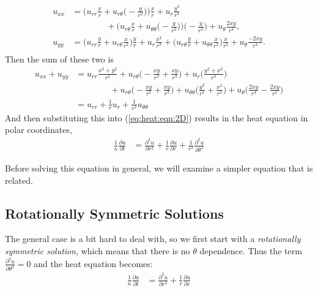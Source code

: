 %
\begin{align*}
u_{xx} & = \biggl(u_{rr} \frac{x}{r} + u_{r\theta} \biggl(-\frac{y}{r^2} \biggr) \biggr)\frac{x}{r} + u_r \frac{y^2}{r^3} \\
& \qquad \qquad + \biggl(u_{r\theta}\frac{x}{r} + u_{\theta\theta}\biggl(-\frac{y}{r^2} \biggr) \biggr)\biggl(-\frac{y}{r^2} \biggr) + u_{\theta}\frac{2xy}{r^4},   \\
u_{yy} & = \biggl(u_{rr} \frac{y}{r} + u_{r\theta} \frac{x}{r^2} \biggr)\frac{y}{r} + u_r \frac{x^2}{r^3} + \biggl(u_{r \theta}\frac{y}{r} + u_{\theta\theta} \frac{x}{r^2} \biggr) \frac{x}{r^2} + u_{\theta}\frac{-2xy}{r^4}. \\
\end{align*}
Then the sum of these two is 
\begin{align*}
u_{xx}+u_{yy} & = u_{rr} \frac{x^2+y^2}{r^2} + u_{r\theta} \biggl(-\frac{xy}{r^3} + \frac{xy}{r^3} \biggr) + u_r \biggl( \frac{y^2+x^2}{r^3}\biggr) \\
& \qquad \qquad  + u_{r \theta} \biggl(-\frac{xy}{r^3} + \frac{xy}{r^3} \biggr) + u_{\theta \theta}\biggl(\frac{y^2}{r^4} + \frac{x^2}{r^4} \biggr) + u_{\theta} \biggl( \frac{2xy}{r^4} - \frac{2xy}{r^4} \biggr) \\
& = u_{rr} + \frac{1}{r} u_r + \frac{1}{r^2} u_{\theta\theta} 
\end{align*}
And then substituting this into (\ref{eq:heat:eqn:2D}) results in the heat equation in polar coordinates,
%
\begin{align}
\frac{1}{\kappa} \frac{\partial u}{\partial t} & = \frac{\partial^2 u}{\partial {r}^2}  + \frac{1}{r} \frac{\partial u}{\partial r}+ \frac{1}{r^2} \frac{\partial^2 u}{\partial {\theta}^2}   \label{eq:heat:eqn:polar}
\end{align}

Before solving this equation in general, we will examine a simpler equation that is related.  

\subsection{Rotationally Symmetric Solutions}

The general case is a bit hard to deal with, so we first start with a \emph{rotationally symmetric solution}, which means that there is no $\theta$ dependence.  Thus the term $ \frac{\partial^2 u}{\partial {\theta}^2} =0$ and the heat equation becomes:
%
\begin{align} \label{eq:heat:rot:sym}
\frac{1}{\kappa} \frac{\partial u}{\partial t} & = \frac{\partial^2 u}{\partial {r}^2}  + \frac{1}{r} \frac{\partial u}{\partial r} 
\end{align}

